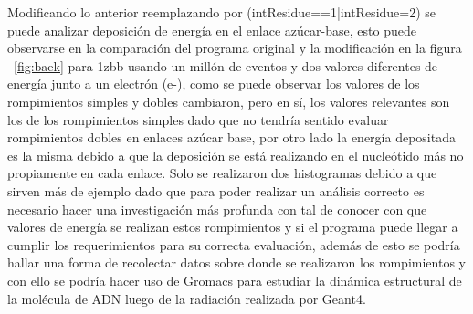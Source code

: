       Modificando lo anterior reemplazando por (intResidue==1|intResidue=2) se puede analizar deposición de energía en el enlace azúcar-base, esto puede observarse en la comparación del programa original y la modificación en la figura ~\ref{fig:baek} para 1zbb usando un millón de eventos y dos valores diferentes de energía junto a un electrón (e-), como se puede observar los valores de los rompimientos simples y dobles cambiaron, pero en sí, los valores relevantes son los de los rompimientos simples dado que no tendría sentido evaluar rompimientos dobles en enlaces azúcar base, por otro lado la energía depositada es la misma debido a que la deposición se está realizando en el nucleótido más no propiamente en cada enlace. Solo se realizaron dos histogramas debido a que sirven más de ejemplo dado que para poder realizar un análisis correcto es necesario hacer una investigación más profunda con tal de conocer con que valores de energía se realizan estos rompimientos y si el programa puede llegar a cumplir los requerimientos para su correcta evaluación, además de esto se podría hallar una forma de recolectar datos sobre donde se realizaron los rompimientos y con ello se podría hacer uso de Gromacs para estudiar la dinámica estructural de la molécula de ADN luego de la radiación realizada por Geant4.
